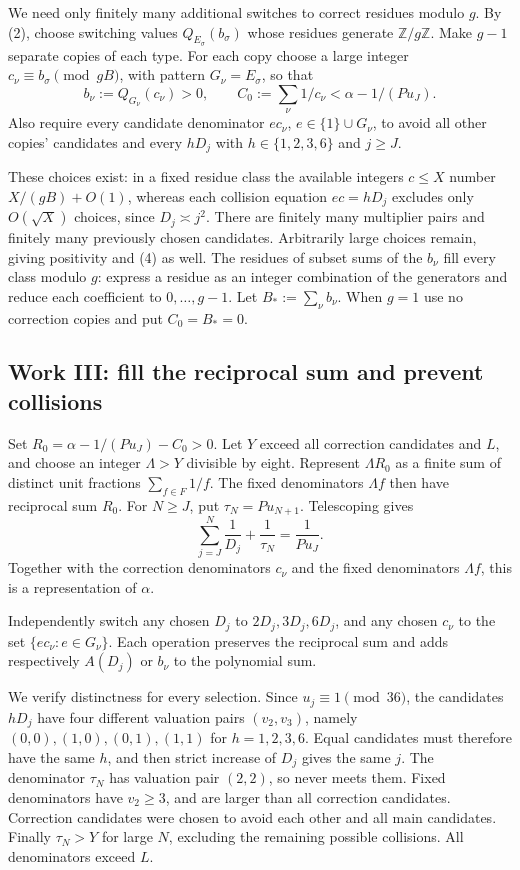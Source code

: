 We need only finitely many additional switches to correct residues modulo $g$. By (2), choose switching values $Q_{E_\sigma}(b_\sigma)$ whose residues generate $\mathbb Z/g\mathbb Z$. Make $g-1$ separate copies of each type. For each copy choose a large integer $c_\nu\equiv b_\sigma\pmod{gB}$, with pattern $G_\nu=E_\sigma$, so that
\[
 b_\nu:=Q_{G_\nu}(c_\nu)>0,
 \qquad C_0:=\sum_\nu1/c_\nu<\alpha-1/(Pu_J).
 \tag{4}
\]
Also require every candidate denominator $ec_\nu$, $e\in\{1\}\cup G_\nu$, to avoid all other copies' candidates and every $hD_j$ with $h\in\{1,2,3,6\}$ and $j\ge J$.

These choices exist: in a fixed residue class the available integers $c\le X$ number $X/(gB)+O(1)$, whereas each collision equation $ec=hD_j$ excludes only $O(\sqrt X)$ choices, since $D_j\asymp j^2$. There are finitely many multiplier pairs and finitely many previously chosen candidates. Arbitrarily large choices remain, giving positivity and (4) as well. The residues of subset sums of the $b_\nu$ fill every class modulo $g$: express a residue as an integer combination of the generators and reduce each coefficient to $0,\ldots,g-1$. Let $B_*:=\sum_\nu b_\nu$. When $g=1$ use no correction copies and put $C_0=B_*=0$.

\subsection{Work III: fill the reciprocal sum and prevent collisions}
Set $R_0=\alpha-1/(Pu_J)-C_0>0$. Let $Y$ exceed all correction candidates and $L$, and choose an integer $\Lambda>Y$ divisible by eight. Represent $\Lambda R_0$ as a finite sum of distinct unit fractions $\sum_{f\in F}1/f$. The fixed denominators $\Lambda f$ then have reciprocal sum $R_0$.
For $N\ge J$, put $\tau_N=Pu_{N+1}$. Telescoping gives
\[
 \sum_{j=J}^{N}\frac1{D_j}+\frac1{\tau_N}=\frac1{Pu_J}.
 \tag{5}
\]
Together with the correction denominators $c_\nu$ and the fixed denominators $\Lambda f$, this is a representation of $\alpha$.

Independently switch any chosen $D_j$ to $2D_j,3D_j,6D_j$, and any chosen $c_\nu$ to the set $\{ec_\nu:e\in G_\nu\}$. Each operation preserves the reciprocal sum and adds respectively $A(D_j)$ or $b_\nu$ to the polynomial sum.

We verify distinctness for every selection. Since $u_j\equiv1\pmod{36}$, the candidates $hD_j$ have four different valuation pairs $(v_2,v_3)$, namely $(0,0),(1,0),(0,1),(1,1)$ for $h=1,2,3,6$. Equal candidates must therefore have the same $h$, and then strict increase of $D_j$ gives the same $j$. The denominator $\tau_N$ has valuation pair $(2,2)$, so never meets them. Fixed denominators have $v_2\ge3$, and are larger than all correction candidates. Correction candidates were chosen to avoid each other and all main candidates. Finally $\tau_N>Y$ for large $N$, excluding the remaining possible collisions. All denominators exceed $L$.

